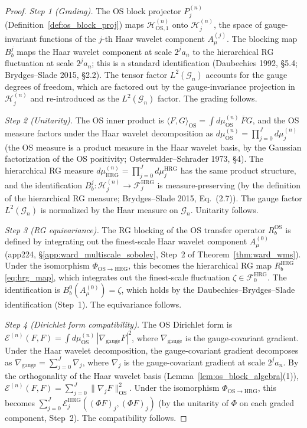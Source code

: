 \begin{proof}
\emph{Step 1 (Grading).} The OS block projector
$P_{j}^{(n)}$ (Definition~\ref{def:os_block_proj}) maps
$\mathcal{H}_{\mathrm{OS},1}^{(n)}$ onto $\mathcal{H}_{j}^{(n)}$,
the space of gauge-invariant functions of the $j$-th Haar wavelet
component $A_{\mu}^{(j)}$. The blocking map $B_{b}^{j}$ maps the
Haar wavelet component at scale $2^{j}a_{n}$ to the hierarchical
RG fluctuation at scale $2^{j}a_{n}$; this is a standard
identification (Daubechies 1992, \S 5.4; Brydges--Slade 2015,
\S 2.2). The tensor factor
$L^{2}(\mathcal{G}_{n})$ accounts for the gauge degrees of
freedom, which are factored out by the gauge-invariance
projection in $\mathcal{H}_{j}^{(n)}$ and re-introduced as the
$L^{2}(\mathcal{G}_{n})$ factor. The grading follows.

\emph{Step 2 (Unitarity).} The OS inner product is
$\langle F,G\rangle_{\mathrm{OS}}=\int d\mu_{\mathrm{OS}}^{(n)}\,
\overline{F}G$, and the OS measure factors under the Haar wavelet
decomposition as
$d\mu_{\mathrm{OS}}^{(n)}=\prod_{j=0}^{J}d\mu_{j}^{(n)}$ (the OS
measure is a product measure in the Haar wavelet basis, by the
Gaussian factorization of the OS positivity; Osterwalder--Schrader
1973, \S 4). The hierarchical RG measure
$d\mu_{\mathrm{HRG}}^{(n)}=\prod_{j=0}^{J}d\mu_{j}^{\mathrm{HRG}}$
has the same product structure, and the identification
$B_{b}^{j}:\mathcal{H}_{j}^{(n)}\to
\mathcal{F}_{j}^{\mathrm{HRG}}$ is measure-preserving (by the
definition of the hierarchical RG measure; Brydges--Slade 2015,
Eq.~(2.7)). The gauge factor $L^{2}(\mathcal{G}_{n})$ is
normalized by the Haar measure on $\mathcal{G}_{n}$. Unitarity
follows.

\emph{Step 3 (RG equivariance).} The RG blocking of the OS
transfer operator $R_{b}^{\mathrm{OS}}$ is defined by integrating
out the finest-scale Haar wavelet component $A_{\mu}^{(0)}$
(app224, \S\ref{app:ward_multiscale_sobolev}, Step~2 of
Theorem~\ref{thm:ward_wms}). Under the isomorphism
$\Phi_{\mathrm{OS}\to\mathrm{HRG}}$, this becomes the
hierarchical RG map $R_{b}^{\mathrm{HRG}}$ \eqref{eq:hrg_map},
which integrates out the finest-scale fluctuation
$\zeta\in\mathcal{F}_{0}^{\mathrm{HRG}}$. The identification is
$B_{b}^{0}(A_{\mu}^{(0)})=\zeta$, which holds by the
Daubechies--Brydges--Slade identification (Step~1). The
equivariance follows.

\emph{Step 4 (Dirichlet form compatibility).} The OS Dirichlet
form is
$\mathcal{E}^{(n)}(F,F)=\int d\mu_{\mathrm{OS}}^{(n)}\,
|\nabla_{\mathrm{gauge}}F|^{2}$, where $\nabla_{\mathrm{gauge}}$ is
the gauge-covariant gradient. Under the Haar wavelet
decomposition, the gauge-covariant gradient decomposes as
$\nabla_{\mathrm{gauge}}=\sum_{j=0}^{J}\nabla_{j}$, where
$\nabla_{j}$ is the gauge-covariant gradient at scale
$2^{j}a_{n}$. By the orthogonality of the Haar wavelet basis
(Lemma~\ref{lem:os_block_algebra}(1)),
$\mathcal{E}^{(n)}(F,F)=\sum_{j=0}^{J}\|\nabla_{j}F\|_{\mathrm{OS}}
^{2}$. Under the isomorphism
$\Phi_{\mathrm{OS}\to\mathrm{HRG}}$, this becomes
$\sum_{j=0}^{J}\mathcal{E}_{j}^{\mathrm{HRG}}((\Phi F)_{j},(\Phi
F)_{j})$ (by the unitarity of $\Phi$ on each graded component,
Step~2). The compatibility follows.
\end{proof}

